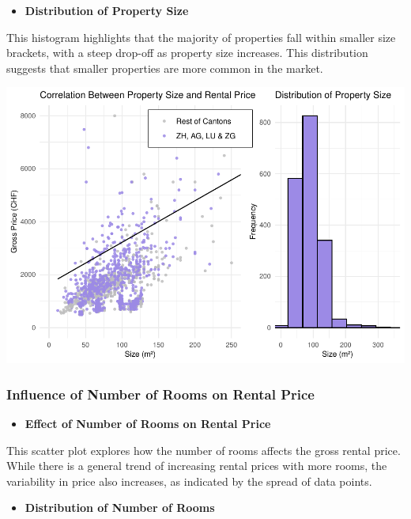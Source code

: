 \documentclass[
]{article}
\providecommand{\tightlist}{%
  \setlength{\itemsep}{0pt}\setlength{\parskip}{0pt}}
\begin{document}
\begin{itemize}
\tightlist
\item
  \textbf{Distribution of Property Size}
\end{itemize}

This histogram highlights that the majority of properties fall within
smaller size brackets, with a steep drop-off as property size increases.
This distribution suggests that smaller properties are more common in
the market.

\includegraphics{2024_groupXX_report_files/figure-latex/Property Size and Rental Price-1.pdf}

\subsubsection{Influence of Number of Rooms on Rental
Price}\label{influence-of-number-of-rooms-on-rental-price}

\begin{itemize}
\tightlist
\item
  \textbf{Effect of Number of Rooms on Rental Price}
\end{itemize}

This scatter plot explores how the number of rooms affects the gross
rental price. While there is a general trend of increasing rental prices
with more rooms, the variability in price also increases, as indicated
by the spread of data points.

\begin{itemize}
\tightlist
\item
  \textbf{Distribution of Number of Rooms}
\end{itemize}
\end{document}
